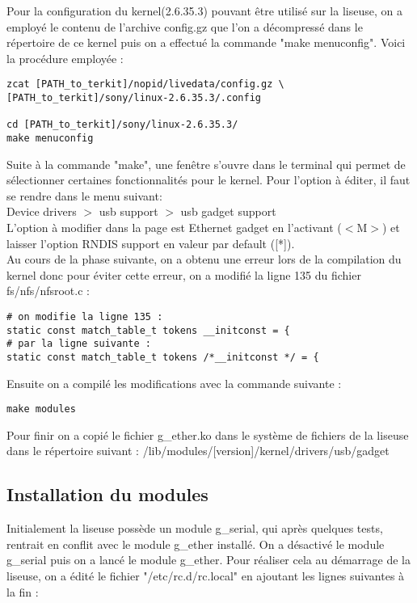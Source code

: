 Pour la configuration du kernel(2.6.35.3) pouvant être utilisé sur la liseuse, on a employé le contenu de l'archive config.gz que l'on a décompressé dans le répertoire de ce kernel puis on a effectué la commande "make menuconfig". Voici la procédure employée :

\begin{lstlisting}
zcat [PATH_to_terkit]/nopid/livedata/config.gz \
[PATH_to_terkit]/sony/linux-2.6.35.3/.config

cd [PATH_to_terkit]/sony/linux-2.6.35.3/
make menuconfig
\end{lstlisting}

Suite à la commande "make", une fenêtre s'ouvre dans le terminal qui permet de sélectionner certaines fonctionnalités pour le kernel. Pour l'option à éditer, il faut se rendre dans le menu suivant: \\
Device drivers $>$ usb support $>$ usb gadget support \\
L'option à modifier dans la page est Ethernet gadget en l'activant ($<$M$>$) et laisser l'option RNDIS support en valeur par default ([*]).\\

Au cours de la phase suivante, on a obtenu une erreur lors de la compilation du kernel donc pour éviter cette erreur, on a modifié la ligne 135 du fichier fs/nfs/nfsroot.c :

\begin{lstlisting}
# on modifie la ligne 135 :
static const match_table_t tokens __initconst = {
# par la ligne suivante :
static const match_table_t tokens /*__initconst */ = { 
\end{lstlisting} 

Ensuite on a compilé les modifications avec la commande suivante :

\begin{lstlisting}
make modules
\end{lstlisting}

Pour finir on a copié le fichier g_ether.ko dans le système de fichiers de la liseuse dans le répertoire suivant : /lib/modules/[version]/kernel/drivers/usb/gadget
 
\subsection{Installation du modules}

Initialement la liseuse possède un module g_serial, qui après quelques tests, rentrait en conflit avec le module g_ether installé. On a désactivé le module g_serial puis on a lancé le module g_ether. Pour réaliser cela au démarrage de la liseuse, on a édité le fichier "/etc/rc.d/rc.local" en ajoutant les lignes suivantes à la fin : 

